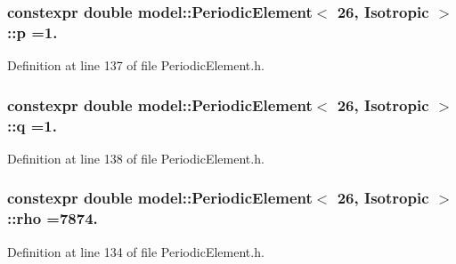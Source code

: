 \subsubsection[{p}]{\setlength{\rightskip}{0pt plus 5cm}constexpr double {\bf model\+::\+Periodic\+Element}$<$ 26, {\bf Isotropic} $>$\+::p =1.\hspace{0.3cm}{\ttfamily [static]}}\label{structmodel_1_1_periodic_element_3_0126_00_01_isotropic_01_4_afba3b66bcbb50471a1a5cf9fb6589dcd}


Definition at line 137 of file Periodic\+Element.\+h.

\hypertarget{structmodel_1_1_periodic_element_3_0126_00_01_isotropic_01_4_aabc8421b3b5d5d09d265a41b7fb1a25e}{}
\subsubsection[{q}]{\setlength{\rightskip}{0pt plus 5cm}constexpr double {\bf model\+::\+Periodic\+Element}$<$ 26, {\bf Isotropic} $>$\+::q =1.\hspace{0.3cm}{\ttfamily [static]}}\label{structmodel_1_1_periodic_element_3_0126_00_01_isotropic_01_4_aabc8421b3b5d5d09d265a41b7fb1a25e}


Definition at line 138 of file Periodic\+Element.\+h.

\hypertarget{structmodel_1_1_periodic_element_3_0126_00_01_isotropic_01_4_a4df1e38356fe48fdf5258c8755fc118b}{}
\subsubsection[{rho}]{\setlength{\rightskip}{0pt plus 5cm}constexpr double {\bf model\+::\+Periodic\+Element}$<$ 26, {\bf Isotropic} $>$\+::rho =7874.\hspace{0.3cm}{\ttfamily [static]}}\label{structmodel_1_1_periodic_element_3_0126_00_01_isotropic_01_4_a4df1e38356fe48fdf5258c8755fc118b}


Definition at line 134 of file Periodic\+Element.\+h.

\hypertarget{structmodel_1_1_periodic_element_3_0126_00_01_isotropic_01_4_aae1bee5b5d216f5064f2cfee92b4cb23}{}
